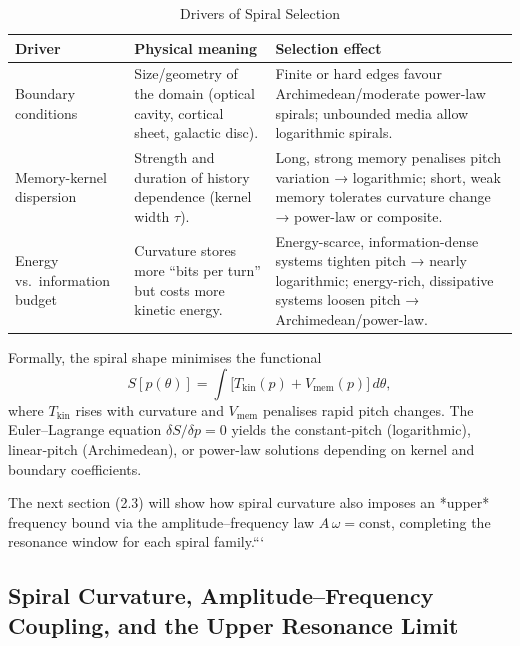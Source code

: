 \begin{table}[H]
  \small
  \centering
  \caption{Drivers of Spiral Selection}
  \label{tab:spiral-drivers}
  \begin{tabular}{@{}p{} p{} p{}@{}}
    \toprule
    \textbf{Driver}
      & \textbf{Physical meaning}
      & \textbf{Selection effect} \\
    \midrule
    Boundary conditions
      & Size/geometry of the domain (optical cavity, cortical sheet, galactic disc).
      & Finite or hard edges favour Archimedean/moderate power-law spirals; unbounded media allow logarithmic spirals. \\
    Memory-kernel dispersion
      & Strength and duration of history dependence (kernel width \(\tau\)).
      & Long, strong memory penalises pitch variation → logarithmic; short, weak memory tolerates curvature change → power-law or composite. \\
    Energy vs.\ information budget
      & Curvature stores more “bits per turn” but costs more kinetic energy.
      & Energy-scarce, information-dense systems tighten pitch → nearly logarithmic; energy-rich, dissipative systems loosen pitch → Archimedean/power-law. \\
    \bottomrule
  \end{tabular}
\end{table}

Formally, the spiral shape minimises the functional
\begin{equation}
  S[p(\theta)]
  = \int \bigl[T_{\mathrm{kin}}(p) + V_{\mathrm{mem}}(p)\bigr]\,d\theta,
\end{equation}
where \(T_{\mathrm{kin}}\) rises with curvature and \(V_{\mathrm{mem}}\) penalises rapid pitch changes.  The Euler–Lagrange equation \(\delta S/\delta p=0\) yields the constant‐pitch (logarithmic), linear‐pitch (Archimedean), or power-law solutions depending on kernel and boundary coefficients.

The next section (2.3) will show how spiral curvature also imposes an *upper* frequency bound via the amplitude–frequency law \(A\,\omega=\mathrm{const}\), completing the resonance window for each spiral family.```

\subsection{Spiral Curvature, Amplitude–Frequency Coupling, and the Upper Resonance Limit}

